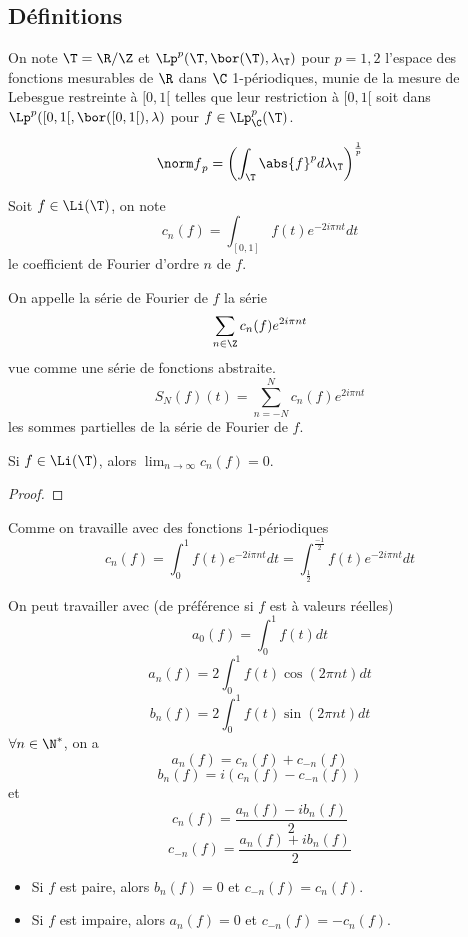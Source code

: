 \subsection{Définitions}


\begin{definition}
	On note $\T = \R / \Z$ et $\Lp^p(\T, \bor (\T), \lambda_{\T})$ pour $p = 1,2$ l'espace des fonctions mesurables de $\R$ dans $\C$ 1-périodiques, munie de la mesure de Lebesgue restreinte à $[0,1[$
	telles que leur restriction à $[0,1[$ soit dans $\Lp^p([0,1[, \bor([0,1[), \lambda)$ pour $f \in \Lp_{\C}^p(\T)$.

	$$ {\norm f}_p = \left( \int_{\T} \abs{f}^p d\lambda_{\T} \right)^{\frac{1}{p}} $$
\end{definition}

\begin{definition}
	Soit $f \in \Li(\T)$, on note
	$$ c_n(f) = \int_{[0,1]} f(t) e^{-2i\pi nt} dt $$
	le coefficient de Fourier d'ordre $n$ de $f$.

	On appelle la série de Fourier de $f$ la série
	$$ \sum_{n \in \Z} c_n(f) e^{2i\pi nt} $$
	vue comme une série de fonctions abstraite.
	$$ S_N(f)(t) = \sum_{n = -N}^{N} c_n(f) e^{2i\pi nt} $$
	les sommes partielles de la série de Fourier de $f$.
\end{definition}

\begin{prop}
	Si $f \in \Li(\T)$, alors $\lim_{n \to \infty} c_n(f) = 0$.
\end{prop}

\begin{proof}
\end{proof}

\begin{remarque}
	Comme on travaille avec des fonctions $1$-périodiques
	$$ c_n(f) = \int_0^1 f(t) e^{-2i\pi nt} dt  = \int_{\frac{1}{2}}^{\frac{-1}{2}} f(t) e^{-2i\pi nt} dt $$
\end{remarque}



\begin{definition}
	On peut travailler avec (de préférence si $f$ est à valeurs réelles)
	$$ a_0(f) = \int_0^1 f(t) dt $$
	$$ a_n(f) = 2\int_0^1 f(t) \cos(2\pi nt) dt $$
	$$ b_n(f) = 2\int_0^1 f(t) \sin(2\pi nt) dt $$
	$\forall n \in \N^*$, on a
	$$ a_n(f) = c_n(f) + c_{-n}(f) $$
	$$ b_n(f) = i(c_n(f) - c_{-n}(f)) $$
	et
	$$ c_n(f) = \frac{a_n(f) - ib_n(f)}{2} $$
	$$ c_{-n}(f) = \frac{a_n(f) + ib_n(f)}{2} $$
\end{definition}


\begin{prop}[Parité]
	\begin{itemize}
		\item Si $f$ est paire, alors $b_n(f) = 0$ et $c_{-n}(f) = c_n(f)$.
		\item Si $f$ est impaire, alors $a_n(f) = 0$ et $c_{-n}(f) = -c_n(f)$.
	\end{itemize}
\end{prop}
